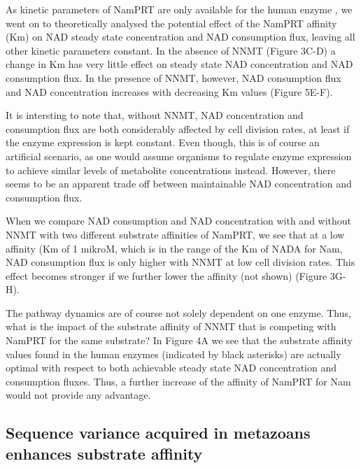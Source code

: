 As kinetic parameters of NamPRT are only available for the human enzyme \cite{Burgos2008} , we went on to theoretically analysed the potential effect of the NamPRT affinity (Km) on NAD steady state concentration and NAD consumption flux, leaving all other kinetic parameters constant. In the absence of NNMT (Figure 3C-D) a change in Km has very little effect on steady state NAD concentration and NAD consumption flux.  In the presence of NNMT, however, NAD consumption flux and NAD concentration increases with decreasing Km values (Figure 5E-F).

It is intersting to note that, without NNMT, NAD concentration and consumption flux are both considerably affected by cell division rates, at least if the enzyme expression is kept constant. Even though, this is of course an artificial scenario, as one would assume organisms to regulate enzyme expression to achieve similar levels of metabolite concentrations instead. However, there seems to be an apparent trade off between maintainable NAD concentration and consumption flux.

When we compare NAD consumption and NAD concentration with and without NNMT with two different substrate affinities of NamPRT, we see that at a low affinity (Km of 1 mikroM, which is in the range of the Km of NADA for Nam, NAD consumption flux is only higher with NNMT at low cell division rates. This effect becomes stronger if we further lower the affinity (not shown) (Figure 3G-H).


The pathway dynamics are of course not solely dependent on one enzyme. Thus, what is the impact of the substrate affinity of NNMT that is competing with NamPRT for the same substrate? In Figure 4A we see that the substrate affinity values found in the human enzymes (indicated by black asterisks) are actually optimal with respect to both achievable steady state NAD concentration and consumption fluxes. Thus, a further increase of the affinity of NamPRT for Nam would not provide any advantage.


\subsection{Sequence variance acquired in metazoans enhances substrate affinity}

